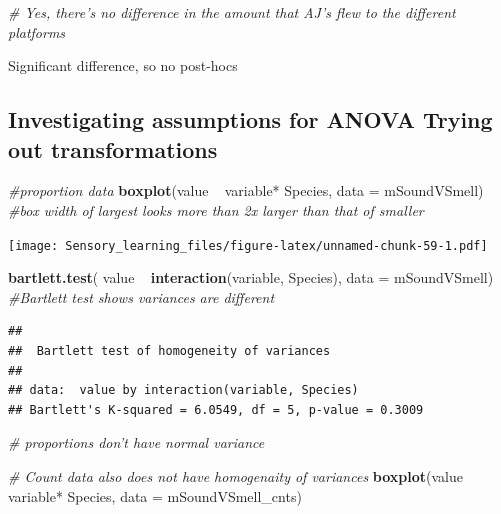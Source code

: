 \documentclass[]{article}
\newenvironment{Shaded}{\begin{snugshade}}{\end{snugshade}}
\newcommand{\KeywordTok}[1]{\textcolor[rgb]{0.13,0.29,0.53}{\textbf{{#1}}}}
\newcommand{\DataTypeTok}[1]{\textcolor[rgb]{0.13,0.29,0.53}{{#1}}}
\newcommand{\StringTok}[1]{\textcolor[rgb]{0.31,0.60,0.02}{{#1}}}
\newcommand{\CommentTok}[1]{\textcolor[rgb]{0.56,0.35,0.01}{\textit{{#1}}}}
\newcommand{\NormalTok}[1]{{#1}}
\begin{document}
\begin{Shaded}
\begin{Highlighting}[]
\CommentTok{# Yes, there's no difference in the amount that AJ's flew to the different platforms}
\end{Highlighting}
\end{Shaded}

Significant difference, so no post-hocs

\subsection{Investigating assumptions for ANOVA Trying out
transformations}\label{investigating-assumptions-for-anova-trying-out-transformations-2}

\begin{Shaded}
\begin{Highlighting}[]
\CommentTok{#proportion data}
\KeywordTok{boxplot}\NormalTok{(value ~}\StringTok{  }\NormalTok{variable*}\StringTok{ }\NormalTok{Species, }\DataTypeTok{data =} \NormalTok{mSoundVSmell) }\CommentTok{#box width of largest looks more than 2x larger than that of smaller}
\end{Highlighting}
\end{Shaded}

\texttt{[image: Sensory\_learning\_files/figure-latex/unnamed-chunk-59-1.pdf]}

\begin{Shaded}
\begin{Highlighting}[]
\KeywordTok{bartlett.test}\NormalTok{( value ~}\StringTok{  }\KeywordTok{interaction}\NormalTok{(variable, Species), }\DataTypeTok{data =} \NormalTok{mSoundVSmell) }\CommentTok{#Bartlett test shows variances are different}
\end{Highlighting}
\end{Shaded}

\begin{verbatim}
## 
##  Bartlett test of homogeneity of variances
## 
## data:  value by interaction(variable, Species)
## Bartlett's K-squared = 6.0549, df = 5, p-value = 0.3009
\end{verbatim}

\begin{Shaded}
\begin{Highlighting}[]
\CommentTok{# proportions don't have normal variance}

\CommentTok{# Count data also does not have homogenaity of variances}
 \KeywordTok{boxplot}\NormalTok{(value ~}\StringTok{  }\NormalTok{variable*}\StringTok{ }\NormalTok{Species, }\DataTypeTok{data =} \NormalTok{mSoundVSmell_cnts)}
\end{Highlighting}
\end{Shaded}
\end{document}
